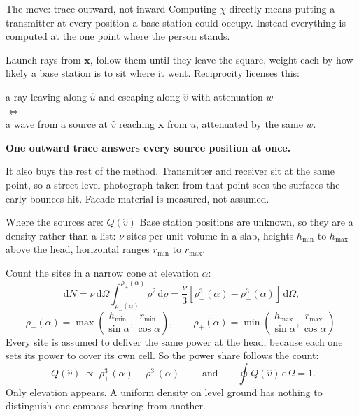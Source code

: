 \documentclass[aspectratio=169,11pt]{beamer}
\newcommand{\uloc}{\hat{u}}
\newcommand{\uext}{\hat{v}}
\newcommand{\x}{\mathbf{x}}
\newcommand{\dOmega}{\,\mathrm{d}\Omega}
\begin{document}
\begin{frame}{The move: trace outward, not inward}
  Computing $\chi$ directly means putting a transmitter at every position a base
  station could occupy. Instead everything is computed at the one point where the
  person stands.

  \vspace{0.6em}
  Launch rays from $\x$, follow them until they leave the square, weight each by
  how likely a base station is to sit where it went. Reciprocity licenses this:
  \begin{center}
    a ray leaving along $\uloc$ and escaping along $\uext$ with attenuation $w$
    \\[0.2em]
    $\Longleftrightarrow$
    \\[0.2em]
    a wave from a source at $\uext$ reaching $\x$ from $\uloc$, attenuated by the same $w$.
  \end{center}

  \vspace{0.6em}
  \textbf{One outward trace answers every source position at once.}

  \vspace{0.4em}
  It also buys the rest of the method. Transmitter and receiver sit at the same
  point, so a street level photograph taken from that point sees the surfaces the
  early bounces hit. Facade material is measured, not assumed.
\end{frame}

\begin{frame}{Where the sources are: $Q(\uext)$}
  Base station positions are unknown, so they are a density rather than a list:
  $\nu$ sites per unit volume in a slab, heights $h_{\min}$ to $h_{\max}$ above
  the head, horizontal ranges $r_{\min}$ to $r_{\max}$.

  Count the sites in a narrow cone at elevation $\alpha$:
  \begin{equation*}
    \mathrm{d}N = \nu \dOmega \int_{\rho_-(\alpha)}^{\rho_+(\alpha)} \rho^2 \, \mathrm{d}\rho
    = \frac{\nu}{3}\left[\rho_+^3(\alpha) - \rho_-^3(\alpha)\right] \dOmega ,
  \end{equation*}
  \begin{equation*}
    \rho_-(\alpha) = \max\!\left(\frac{h_{\min}}{\sin\alpha}, \frac{r_{\min}}{\cos\alpha}\right),
    \qquad
    \rho_+(\alpha) = \min\!\left(\frac{h_{\max}}{\sin\alpha}, \frac{r_{\max}}{\cos\alpha}\right).
  \end{equation*}
  Every site is assumed to deliver the same power at the head, because each one
  sets its power to cover its own cell. So the power share follows the count:
  \begin{equation*}
    \boxed{\;Q(\uext) \;\propto\; \rho_+^3(\alpha) - \rho_-^3(\alpha)\;}
    \qquad \text{and} \qquad \oint Q(\uext) \dOmega = 1 .
  \end{equation*}
  Only elevation appears. A uniform density on level ground has nothing to
  distinguish one compass bearing from another.
\end{frame}
\end{document}
